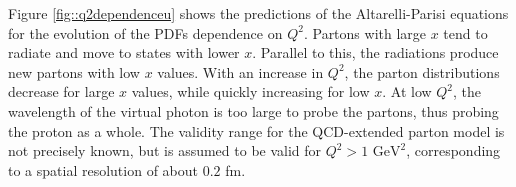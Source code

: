 Figure \ref{fig::q2dependenceu} shows the predictions of the Altarelli-Parisi equations for the evolution of the PDFs dependence on $Q^2$.
Partons with large $x$ tend to radiate and move to states with lower $x$.
Parallel to this, the radiations produce new partons with low $x$ values.
With an increase in $Q^2$, the parton distributions decrease for large $x$ values, while quickly increasing for low $x$.
At low $Q^2$, the wavelength of the virtual photon is too large to probe the partons, thus probing the proton as a whole.
The validity range for the QCD-extended parton model is not precisely known, but is assumed to be valid for $Q^2 > 1 \text{ GeV}^2$, corresponding to a spatial resolution of about $0.2$ fm.
